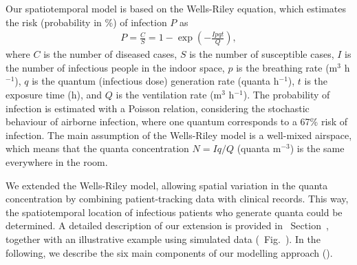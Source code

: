 \documentclass[fleqn,11pt]{wlscirep}
\begin{document}
Our spatiotemporal model is based on the Wells-Riley equation\cite{Riley1961Book}, which estimates the risk (probability in \%) of infection $P$ as
\begin{align}
    P = \frac{C}{S} = 1 - \exp\left(-\frac{Ipqt}{Q}\right),
\end{align}
where $C$ is the number of diseased cases, $S$ is the number of susceptible cases, $I$ is the number of infectious people in the indoor space, $p$ is the breathing rate (m$^3$ h$^{-1}$), $q$ is the quantum (infectious dose) generation rate (quanta h$^{-1}$), $t$ is the exposure time (h), and $Q$ is the ventilation rate (m$^3$ h$^{-1}$). The probability of infection is estimated with a Poisson relation, considering the stochastic behaviour of airborne infection, where one quantum corresponds to a 67\% risk of infection. The main assumption of the Wells-Riley model is a well-mixed airspace, which means that the quanta concentration $N = Iq/Q$ (quanta m$^{-3}$) is the same everywhere in the room. 

We extended the Wells-Riley model, allowing spatial variation in the quanta concentration by combining patient-tracking data with clinical records. This way, the spatiotemporal location of infectious patients who generate quanta could be determined. A detailed description of our extension is provided in \supp~Section~, together with an illustrative example using simulated data (\supp~Fig.~). In the following, we describe the six main components of our modelling approach ().
\end{document}
